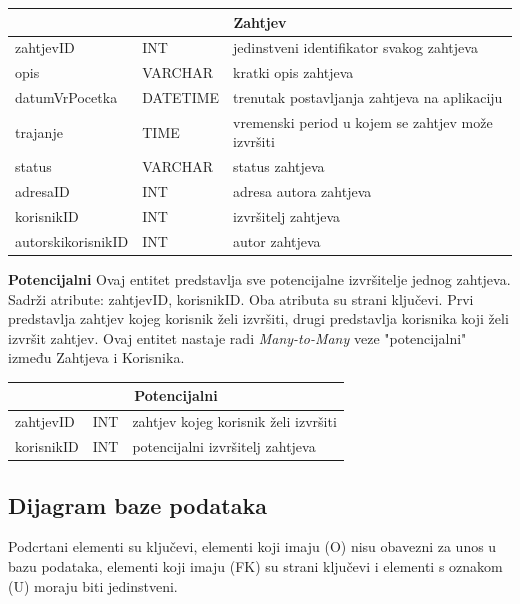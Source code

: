 			\begin{tabularx} {\textwidth} {|p{3.5cm}|p{2cm}|X|}
				
				\hline
				\multicolumn{3}{|c|}{\textbf{Zahtjev}} \\
				\hline
				
				\cellcolor{LightGreen}zahtjevID & INT	& jedinstveni identifikator svakog zahtjeva	\\ \hline
				opis	& VARCHAR &  kratki opis zahtjeva 	\\ \hline 
				datumVrPocetka & DATETIME &  trenutak postavljanja zahtjeva na aplikaciju \\ \hline 
				trajanje & TIME	&  vremenski period u kojem se zahtjev može izvršiti		\\ \hline 
				status & VARCHAR & status zahtjeva  \\ \hline
				\cellcolor{LightBlue} adresaID	& INT &  adresa autora zahtjeva 	\\ \hline 
				\cellcolor{LightBlue} korisnikID	& INT &  izvršitelj zahtjeva 	\\ \hline
				\cellcolor{LightBlue} autorskikorisnikID	& INT &   autor zahtjeva	\\ \hline
				
				
			\end{tabularx}
			
			\bigskip
			\bigskip
			\textbf{Potencijalni} Ovaj entitet predstavlja sve potencijalne izvršitelje jednog zahtjeva. Sadrži atribute: zahtjevID, korisnikID. Oba atributa su strani ključevi. Prvi predstavlja zahtjev kojeg korisnik želi izvršiti, drugi predstavlja korisnika koji želi izvršit zahtjev. Ovaj entitet nastaje radi \textit{Many-to-Many} veze "potencijalni" između Zahtjeva i Korisnika.
			\bigskip
			
			\begin{tabularx}{\textwidth} {|p{2cm}|p{2cm}|X|}
				\hline
				\multicolumn{3}{|c|}{\textbf{Potencijalni}} \\
				\hline
				\cellcolor{LightGreen} zahtjevID & INT & zahtjev kojeg korisnik želi izvršiti \\
				\hline
				\cellcolor{LightGreen} korisnikID & INT & potencijalni izvršitelj zahtjeva \\
				\hline
			\end{tabularx}
			
			
			
			\newpage
			\subsection{Dijagram baze podataka}
			Podcrtani elementi su ključevi, elementi koji imaju (O) nisu obavezni za unos u bazu podataka, elementi koji imaju (FK) su strani ključevi i elementi s oznakom (U) moraju biti jedinstveni.
			
